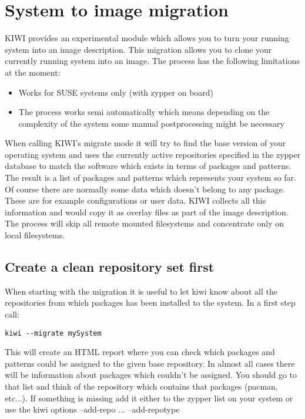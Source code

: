 \chapter{System to image migration}
\label{chapter:migration}
\minitoc

KIWI provides an experimental module which allows you to turn your
running system into an image description. This migration allows you
to clone your currently running system into an image. The process
has the following limitations at the moment:

\begin{itemize}
\item Works for SUSE systems only (with zypper on board)
\item The process works semi automatically which means depending
      on the complexity of the system some manual postprocessing might
      be necessary
\end{itemize}

When calling KIWI's migrate mode it will try to find the base version
of your operating system and uses the currently active repositories
specified in the zypper database to match the software which exists
in terms of packages and patterns. The result is a list of packages
and patterns which represents your system so far. Of course there are
normally some data which doesn't belong to any package. These are
for example configurations or user data. KIWI collects all this
information and would copy it as overlay files as part of the image
description. The process will skip all remote mounted filesystems
and concentrate only on local filesystems.

\section{Create a clean repository set first}
When starting with the migration it is useful to let kiwi know about all
the repositories from which packages has been installed to 
the system. In a first step call:

\begin{Command}{12cm}
\begin{verbatim}
kiwi --migrate mySystem
\end{verbatim}
\end{Command}

This will create an HTML report where you can check which packages and
patterns could be assigned to the given base repository. In almost
all cases there will be information about packages which couldn't
be assigned. You should go to that list and think of the repository
which contains that packages (pacman, etc...). If something is missing
add it either to the zypper list on your system or use the kiwi
options --add-repo ... --add-repotype

